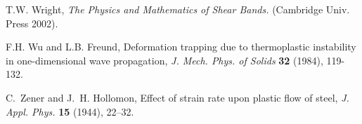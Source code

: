 \documentclass[a4paper,11pt]{article}
\theoremstyle{remark}
\begin{document}
\begin{thebibliography}{10}
%
%
%



%
%
%
%

%
%
{\sc T.W. Wright},
{\it The Physics and Mathematics of Shear Bands.} (Cambridge Univ. Press 2002).
%

{\sc F.H. Wu and L.B. Freund},
Deformation trapping due to thermoplastic instability in one-dimensional wave propagation,
{\it J. Mech. Phys. of Solids} {\bf  32} (1984), 119-132.

{\sc C.~Zener and J.~H. Hollomon},
Effect of strain rate upon plastic flow of steel,
{\it J. Appl. Phys.}
{\bf 15} (1944), 22--32.

\end{thebibliography}
\end{document}
